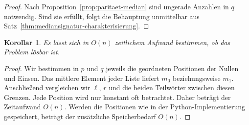\documentclass[12pt]{article}
\newtheorem{cor}[thm]{Korollar}
\begin{document}
\begin{proof}
Nach Proposition~\ref{prop:paritaet-median} sind ungerade Anzahlen in $q$
notwendig. Sind sie erfüllt, folgt die Behauptung unmittelbar aus
Satz~\ref{thm:mediansignatur-charakterisierung}.
\end{proof}

\begin{cor}
Es lässt sich in $O(n)$ zeitlichem Aufwand bestimmen, ob das Problem lösbar
ist.
\end{cor}

\begin{proof}
Wir bestimmen in $p$ und $q$ jeweils die geordneten Positionen der Nullen und
Einsen. Das mittlere Element jeder Liste liefert $m_0$ beziehungsweise $m_1$.
Anschließend vergleichen wir $\ell$, $r$ und die beiden Teilwörter zwischen
diesen Grenzen. Jede Position wird nur konstant oft betrachtet. Daher beträgt
der Zeitaufwand $O(n)$. Werden die Positionen wie in der Python-Implementierung
gespeichert, beträgt der zusätzliche Speicherbedarf $O(n)$.
\end{proof}
\end{document}
